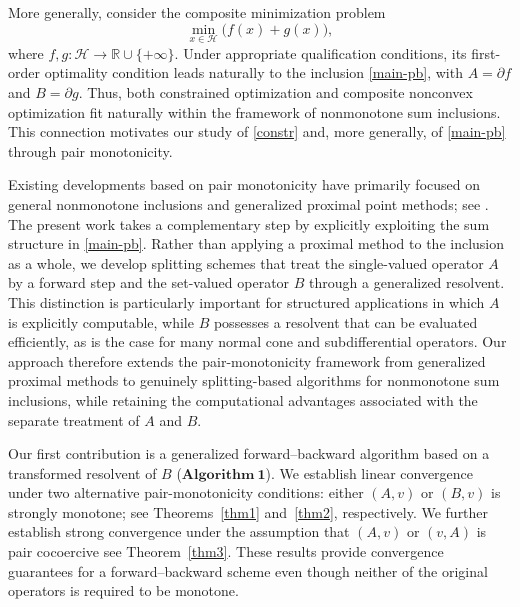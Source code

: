 \documentclass[11pt]{article}
\theoremstyle{definition}
\theoremstyle{definition}
\theoremstyle{definition}
\begin{document}
More generally, consider the composite minimization problem
$$
\min_{x\in\mathcal{H}}\bigl(f(x)+g(x)\bigr),
$$
where $f,g:\mathcal{H}\to\mathbb{R}\cup\{+\infty\}$. Under appropriate qualification conditions, its first-order optimality condition leads naturally to the inclusion \eqref{main-pb}, with $A=\partial f$ and $B=\partial g$. Thus, both constrained optimization and composite nonconvex optimization fit naturally within the framework of nonmonotone sum inclusions. This connection motivates our study of \eqref{constr} and, more generally, of \eqref{main-pb} through pair monotonicity.

Existing developments based on pair monotonicity have primarily focused on general nonmonotone inclusions and generalized proximal point methods; see \cite{LDT,LMT}. The present work takes a complementary step by explicitly exploiting the sum structure in \eqref{main-pb}. Rather than applying a proximal method to the inclusion as a whole, we develop splitting schemes that treat the single-valued operator $A$ by a forward step and the set-valued operator $B$ through a generalized resolvent. This distinction is particularly important for structured applications in which $A$ is explicitly computable, while $B$ possesses a resolvent that can be evaluated efficiently, as is the case for many normal cone and subdifferential operators. Our approach therefore extends the pair-monotonicity framework from generalized proximal methods to genuinely splitting-based algorithms for nonmonotone sum inclusions, while retaining the computational advantages associated with the separate treatment of $A$ and $B$.

Our first contribution is a generalized forward--backward algorithm based on a transformed resolvent of $B$ ($\mathbf{Algorithm~1}$). We establish linear convergence under two alternative pair-monotonicity conditions: either $(A,v)$ or $(B,v)$ is strongly monotone; see Theorems~\ref{thm1} and~\ref{thm2}, respectively. We further establish strong convergence under the assumption that {$(A,v)$ or $(v,A)$} is pair cocoercive  see Theorem~\ref{thm3}. These results provide convergence guarantees for a forward--backward scheme even though neither of the original operators is required to be monotone.
\end{document}

